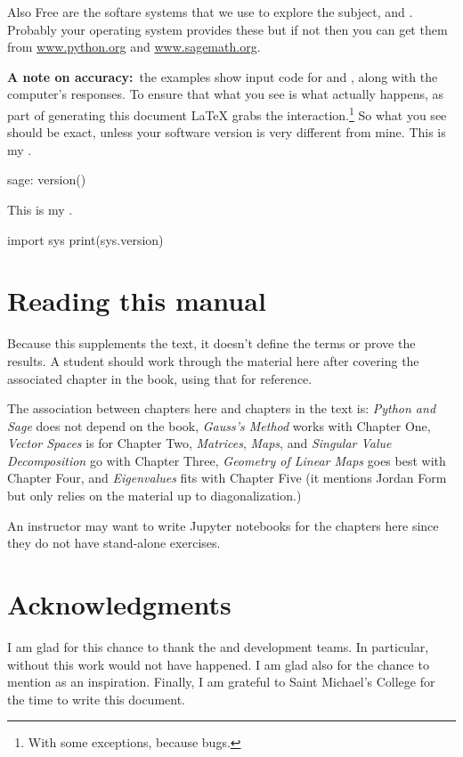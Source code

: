 Also Free are the softare systems that we use to explore the subject,
\python{} and \Sage{}.
Probably your operating system provides these but if not then 
you can get them from  
\href{http://www.python.org}{\url{www.python.org}}
and 
\href{https://www.sagemath.org}{\url{www.sagemath.org}}.

\textbf{A note on accuracy:}~the examples 
show input code for \python{} and \Sage{}, 
along with the computer's responses.
To ensure that what you see is what actually happens,
as part of generating this 
document \LaTeX{} grabs the interaction.\footnote{%
  With some exceptions, because bugs.}
So what you see should be exact,
unless your software version is very different from mine.
This is my \Sage.
\begin{sagecommandline}
sage: version()  
\end{sagecommandline}
This is my \python{}. 
\begin{pythonconsole}
import sys
print(sys.version)
\end{pythonconsole}




\section{Reading this manual}
Because this supplements the text, 
it doesn't define the terms or prove the results.
A student should work through the material here after covering the associated
chapter in the book, using that for reference.

The association between chapters here and chapters in the text is:
\textit{Python and Sage} does not depend on the
book,
\textit{Gauss’s Method} works with Chapter One,
\textit{Vector Spaces} is for Chapter Two,
\textit{Matrices}, 
\textit{Maps}, and 
\textit{Singular Value Decomposition} go with Chapter Three,
\textit{Geometry of Linear Maps} goes best with Chapter Four,
and \textit{Eigenvalues} fits with Chapter Five
(it mentions Jordan Form but only relies on the material up to 
diagonalization.)

An instructor may want to write Jupyter notebooks for the chapters here
since they do not have stand-alone exercises.




\section{Acknowledgments}
I am glad for this chance to thank the \python{} and
\Sage{} development teams.
In particular,
without \citep{SageTeam19ref} this work would not have happened.
I am glad also for the chance to mention 
\citep{Beezer11} as an inspiration.
Finally, I am grateful to Saint Michael's College for the 
time to write this document.





